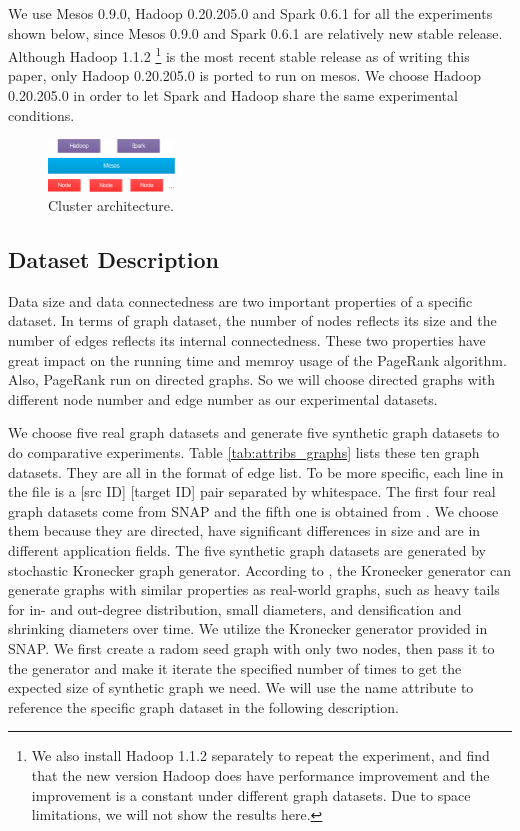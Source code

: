 \documentclass[12pt,conference,letterpaper]{IEEEtran}
\begin{document}
We use Mesos 0.9.0, Hadoop 0.20.205.0 and Spark 0.6.1 for all the experiments shown below, since  Mesos 0.9.0 and Spark 0.6.1 are relatively new stable release. Although Hadoop 1.1.2 \footnote{We also install Hadoop 1.1.2 separately to repeat the experiment, and find that the new version Hadoop does have performance improvement and the improvement is a constant under different graph datasets. Due to space limitations, we will not show the results here.} is the most recent stable release as of writing this paper, only Hadoop 0.20.205.0 is ported to run on mesos. We choose Hadoop 0.20.205.0 in order to let Spark and Hadoop share the same experimental conditions.
\begin{figure}[!t]
\centering
\includegraphics[width=0.3\textwidth]{figures/cluster-architect.eps}
\caption{Cluster architecture.}
\label{fig:cluster-architec}
\end{figure}


\subsection{Dataset Description}
\label{subsec:dataset_des}

Data size and data connectedness are two important properties of a specific dataset. In terms of graph dataset, the number of nodes reflects its size and the number of edges reflects its internal connectedness. These two properties have great impact on the running time and memroy usage of the PageRank algorithm. Also, PageRank run on directed graphs. So we will choose directed graphs with different node number and edge number as our experimental datasets.


We choose five real graph datasets and generate five synthetic graph datasets to do comparative experiments. Table \ref{tab:attribs_graphs} lists these ten graph datasets. They are all in the format of edge list. To be more specific, each line in the file is a [src ID] [target ID] pair separated by whitespace. The first four real graph datasets come from SNAP\cite{url_snap} and the fifth one is obtained from \cite{zafarani2009}. We choose them because they are directed, have significant differences in size and are in different application fields. The five synthetic graph datasets are generated by stochastic Kronecker graph generator. According to \cite{jurij2005}, the Kronecker generator can generate graphs with similar properties as real-world graphs, such as heavy tails for in- and out-degree distribution, small diameters, and densification and shrinking diameters over time. We utilize the Kronecker generator provided in SNAP\cite{url_snap}. We first create a radom seed graph with only two nodes, then pass it to the generator and make it iterate the specified number of times to get the expected size of synthetic graph we need. We will use the name attribute to reference the specific graph dataset in the following description.
\end{document}
